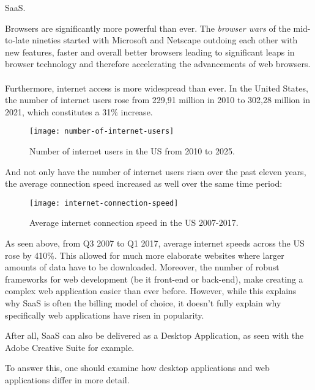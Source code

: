 SaaS.\par
Browsers are significantly more powerful than ever. 
The \emph{browser wars} of the mid-to-late nineties started with Microsoft and Netscape outdoing each other with
new features, faster and overall better browsers leading to significant leaps in browser technology and therefore 
accelerating the advancements of web browsers. \parencite{mozilla2021,jensen2017}\paragraph{}
Furthermore, internet access is more widespread than ever.
In the United States, the number of internet users rose from 229,91 million in 2010 to 302,28 million in 2021,
which constitutes a 31\% increase.\par
\begin{figure}[H]
    \centering
    \label{fig:num-of-internet-users}
    \caption{Number of internet users in the US from 2010 to 2025. \parencite{statista2021}}
    \texttt{[image: number-of-internet-users]}
\end{figure}
And not only have the number of internet users risen over the past eleven years, the average connection speed increased as well
over the same time period:
\begin{figure}[H]
    \centering
    \label{fig:internet-speed}
    \caption{Average internet connection speed in the US 2007-2017. \parencite{akamai2017}}
    \texttt{[image: internet-connection-speed]}
\end{figure}
As seen above, from Q3 2007 to Q1 2017, average internet speeds across the US rose by 410\%.
This allowed for much more elaborate websites where larger amounts of data have to be downloaded.
Moreover, the number of robust frameworks for web development (be it front-end or back-end), make creating a complex web application easier
than ever before.
However, while this explains why SaaS is often the billing model of choice, it doesn't fully explain why specifically web applications
have risen in popularity. \parencite{statista2021}\par
After all, SaaS can also be delivered as a Desktop Application, as seen with the Adobe Creative Suite for example. \parencite{adobe2021}\par
To answer this, one should examine how desktop applications and web applications differ in more detail.

